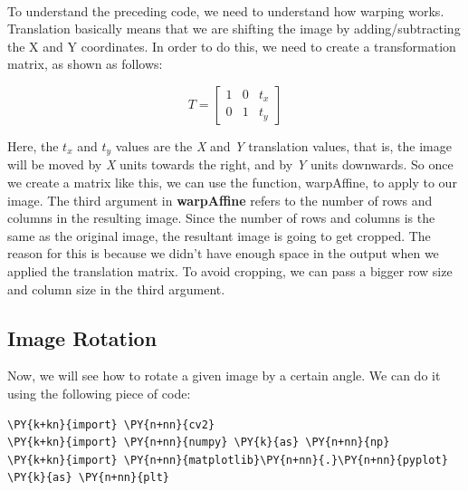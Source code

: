 \begin{center}
\end{center}
{ \hspace*{\fill} \\}

To understand the preceding code, we need to understand how warping works. Translation basically means that we are shifting the image by adding/subtracting the X and Y coordinates. In order to do this, we need to create a transformation matrix, as shown as follows:

\begin{center}
\[
\textit{T} =  
\begin{bmatrix}
	1 & 0 & t_{x} \\
	0 & 1 & t_{y}
\end{bmatrix}
\]
\end{center}

Here, the $t_x$ and $t_y$ values are the \textit{X} and \textit{Y} translation values, that is, the image will be moved by \textit{X} units towards 	the right, and by \textit{Y} units downwards. So once we create a matrix like this, we can use the function, warpAffine, to 	apply to our image. The third argument in \textbf{warpAffine} refers to the number of rows and columns in the resulting image. Since the number of rows and columns is the same as the original image, the resultant image is going to get cropped. The reason for this is because we didn't have enough space in the output when we applied the translation matrix. To 	avoid cropping, we can pass a bigger row size and column size in the third argument.

\subsection{Image Rotation}
Now, we will see how to rotate a given image by a certain angle. We can do it using the following piece of code:

\vspace{0.5cm}

\begin{tcolorbox}[breakable, size=fbox, boxrule=1pt, pad at break*=1mm,colback=cellbackground, colframe=cellborder]
	\begin{Verbatim}[commandchars=\\\{\}]
\PY{k+kn}{import} \PY{n+nn}{cv2}
\PY{k+kn}{import} \PY{n+nn}{numpy} \PY{k}{as} \PY{n+nn}{np}
\PY{k+kn}{import} \PY{n+nn}{matplotlib}\PY{n+nn}{.}\PY{n+nn}{pyplot} \PY{k}{as} \PY{n+nn}{plt}
	\end{Verbatim}
\end{tcolorbox}

